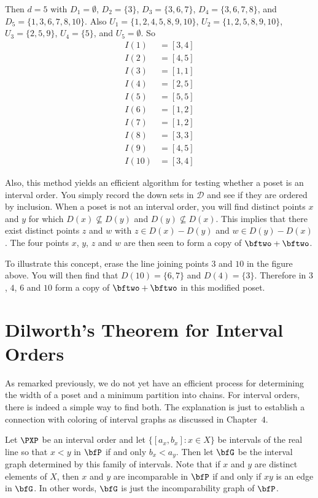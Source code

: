 Then $d= 5$ with 
$D_1=\emptyset$, $D_2=\{3\}$, $D_3=\{3,6,7\}$, $D_4=\{3,6,7,8\}$, and 
$D_5=\{1,3,6,7,8,10\}$.  Also
$U_1=\{1,2,4,5,8,9,10\}$, $U_2=\{1,2,5,8,9,10\}$,
$U_3=\{2,5,9\}$, $U_4=\{5\}$, and $U_5=\emptyset$.
So
\begin{align*}
I(1) &= [3,4]\\
I(2) &= [4,5]\\
I(3) &= [1,1]\\
I(4) &= [2,5]\\
I(5) &= [5,5]\\
I(6) &= [1,2]\\
I(7) &= [1,2]\\
I(8) &= [3,3]\\
I(9) &= [4,5]\\
I(10) &= [3,4]
\end{align*}

Also, this method yields an efficient algorithm for testing
whether a poset is an interval order.  You simply record the
down sets in $\mathcal{D}$ and see if they are ordered by
inclusion.  When a poset is not an interval order, you will
find distinct points $x$ and $y$ for which $D(x)\nsubseteq D(y)$
and $D(y)\nsubseteq D(x)$.  This implies that there exist
distinct points $z$ and $w$ with
$z\in D(x)-D(y)$ and $w\in D(y)-D(x)$.  The four points $x$, $y$,
$z$ and $w$ are then seen to form a copy of $\bftwo+\bftwo$. 

To illustrate this concept, erase the line joining points
$3$ and $10$ in the figure above.  You will then
find that $D(10)=\{6,7\}$ and $D(4)=\{3\}$.  Therefore
in $3$, $4$, $6$ and $10$ form a copy of $\bftwo+\bftwo$ in this
modified poset.

\section{Dilworth's Theorem for Interval Orders}\label{s:posets:dilworth-intord}

As remarked previously, we do not yet have an efficient
process for determining the width of a poset and a minimum
partition into chains.  For interval orders, there is indeed
a simple way to find both. The explanation is just to establish
a connection with coloring of interval graphs as discussed in
Chapter~$4$.

Let $\PXP$ be an interval order and let 
$\{[a_x,b_x]:x\in X\}$ be intervals of the real line
so that $x<y$ in $\bfP$ if and only $b_x<a_y$.
Then let $\bfG$ be the interval graph determined by this
family of intervals.  Note that if $x$ and $y$ are distinct
elements of $X$, then $x$ and $y$ are incomparable in $\bfP$ if and
only if $xy$ is an edge in $\bfG$.  In other words, $\bfG$ is
just the incomparability graph of $\bfP$.

